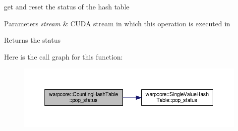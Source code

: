 get and reset the status of the hash table 


\begin{DoxyParams}{Parameters}
{\em stream} & C\+U\+DA stream in which this operation is executed in \\
\hline
\end{DoxyParams}
\begin{DoxyReturn}{Returns}
the status 
\end{DoxyReturn}
Here is the call graph for this function\+:
\nopagebreak
\begin{figure}[H]
\begin{center}
\leavevmode
\includegraphics[width=350pt]{classwarpcore_1_1CountingHashTable_a9313aefeadf39f1c0512f131859922ab_cgraph}
\end{center}
\end{figure}
\mbox{\label{classwarpcore_1_1CountingHashTable_ab156b6726ca60e401fae990274b40cfc}} 

